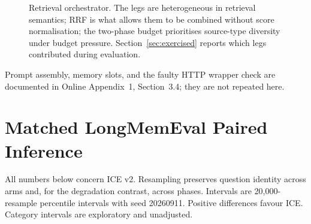\documentclass[twoside,11pt]{article}
\begin{document}
\begin{figure}[tbp]
\centering
{}
\caption{Retrieval orchestrator. The legs are heterogeneous in retrieval semantics; RRF is what allows them to be combined without score normalisation; the two-phase budget prioritises source-type diversity under budget pressure. Section~\ref{sec:exercised} reports which legs contributed during evaluation.}
\label{fig:orchestrator}
\end{figure}

Prompt assembly, memory slots, and the faulty HTTP wrapper check are documented in Online Appendix~1, Section~3.4; they are not repeated here.

\FloatBarrier
\section{Matched LongMemEval Paired Inference}
\label{app:lme-paired}
All numbers below concern ICE v2. Resampling preserves question identity across arms and, for the degradation contrast, across phases. Intervals are 20,000-resample percentile intervals with seed 20260911. Positive differences favour ICE. Category intervals are exploratory and unadjusted.
\end{document}
